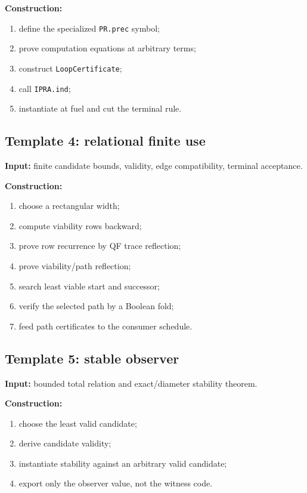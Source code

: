 \textbf{Construction:}
\begin{enumerate}[label=(\arabic*)]
  \item define the specialized \texttt{PR.prec} symbol;
  \item prove computation equations at arbitrary terms;
  \item construct \texttt{LoopCertificate};
  \item call \texttt{IPRA.ind};
  \item instantiate at fuel and cut the terminal rule.
\end{enumerate}

\subsection{Template 4: relational finite use}

\textbf{Input:} finite candidate bounds, validity, edge compatibility, terminal acceptance.

\textbf{Construction:}
\begin{enumerate}[label=(\arabic*)]
  \item choose a rectangular width;
  \item compute viability rows backward;
  \item prove row recurrence by QF trace reflection;
  \item prove viability/path reflection;
  \item search least viable start and successor;
  \item verify the selected path by a Boolean fold;
  \item feed path certificates to the consumer schedule.
\end{enumerate}

\subsection{Template 5: stable observer}

\textbf{Input:} bounded total relation and exact/diameter stability theorem.

\textbf{Construction:}
\begin{enumerate}[label=(\arabic*)]
  \item choose the least valid candidate;
  \item derive candidate validity;
  \item instantiate stability against an arbitrary valid candidate;
  \item export only the observer value, not the witness code.
\end{enumerate}

